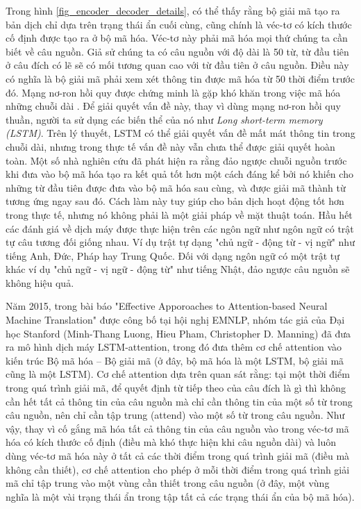 Trong hình \ref{fig_encoder_decoder_details}, có thể thấy rằng bộ giải mã tạo ra bản dịch chỉ dựa trên trạng thái ẩn cuối cùng, cũng chính là véc-tơ có kích thước cố định được tạo ra ở bộ mã hóa. Véc-tơ này phải mã hóa mọi thứ chúng ta cần biết về câu nguồn. Giả sử chúng ta có câu nguồn với độ dài là 50 từ, từ đầu tiên ở câu đích có lẽ sẽ có mối tương quan cao với từ đầu tiên ở câu nguồn. Điều này có nghĩa là bộ giải mã phải xem xét thông tin được mã hóa từ 50 thời điểm trước đó. Mạng nơ-ron hồi quy được chứng minh là gặp khó khăn trong việc mã hóa những chuỗi dài \cite{pascanu2011}. Để giải quyết vấn đề này, thay vì dùng mạng nơ-ron hồi quy thuần, người ta sử dụng các biến thể của nó như \textit{Long short-term memory (LSTM)}. Trên lý thuyết, LSTM có thể giải quyết vấn đề mất mát thông tin trong chuỗi dài, nhưng trong thực tế vấn đề này vẫn chưa thể được giải quyết hoàn toàn. Một số nhà nghiên cứu đã phát hiện ra rằng đảo ngược chuỗi nguồn trước khi đưa vào bộ mã hóa tạo ra kết quả tốt hơn một cách đáng kể \cite{Seq2Seq2014} bởi nó khiến cho những từ đầu tiên được đưa vào bộ mã hóa sau cùng, và được giải mã thành từ tương ứng ngay sau đó. Cách làm này tuy giúp cho bản dịch hoạt động tốt hơn trong thực tế, nhưng nó không phải là một giải pháp về mặt thuật toán. Hầu hết các đánh giá về dịch máy được thực hiện trên các ngôn ngữ như ngôn ngữ có trật tự câu tương đối giống nhau. Ví dụ trật tự dạng "chủ ngữ - động từ - vị ngữ" như tiếng Anh, Đức, Pháp hay Trung Quốc. Đối với dạng ngôn ngữ có một trật tự khác ví dụ "chủ ngữ - vị ngữ - động từ" như tiếng Nhật, đảo ngược câu nguồn sẽ không hiệu quả.

Năm 2015, trong bài báo "Effective Apporoaches to Attention-based Neural Machine Translation" \cite{attentionThangLuong2015} được công bố tại hội nghị EMNLP, nhóm tác giả của Đại học Stanford (Minh-Thang Luong, Hieu Pham, Christopher D. Manning) đã đưa ra mô hình dịch máy LSTM-attention, trong đó đưa thêm cơ chế attention vào kiến trúc Bộ mã hóa – Bộ giải mã (ở đây, bộ mã hóa là một LSTM, bộ giải mã cũng là một LSTM). Cơ chế attention dựa trên quan sát rằng: tại một thời điểm trong quá trình giải mã, để quyết định từ tiếp theo của câu đích là gì thì không cần hết tất cả thông tin của câu nguồn mà chỉ cần thông tin của một số từ trong câu nguồn, nên chỉ cần tập trung (attend) vào một số từ trong câu nguồn. Như vậy, thay vì cố gắng mã hóa tất cả thông tin của câu nguồn vào trong véc-tơ mã hóa có kích thước cố định (điều mà khó thực hiện khi câu nguồn dài) và luôn dùng véc-tơ mã hóa này ở tất cả các thời điểm trong quá trình giải mã (điều mà không cần thiết), cơ chế attention cho phép ở mỗi thời điểm trong quá trình giải mã chỉ tập trung vào một vùng cần thiết trong câu nguồn (ở đây, một vùng nghĩa là một vài trạng thái ẩn trong tập tất cả các trạng thái ẩn của bộ mã hóa).

